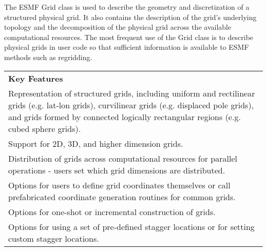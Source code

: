 %

The ESMF Grid class is used to describe the geometry and discretization
of a structured physical grid.  It also contains the description of the
grid's underlying topology and the decomposition of the physical grid
across the available computational resources.  The most frequent 
use of the Grid class is to describe physical grids in user
code so that sufficient information is available to ESMF methods
such as regridding. 

\begin{center}
\begin{tabular}{|p{6in}|}
\hline
\vspace{.01in}
{\bf Key Features} \\[.01in]
Representation of structured grids, including uniform and
rectilinear grids (e.g. lat-lon grids), curvilinear grids (e.g. displaced pole grids), 
and grids formed by connected logically rectangular regions (e.g. cubed
sphere grids).\\
Support for 2D, 3D, and higher dimension grids.\\ 
Distribution of grids across computational resources for parallel
operations -  users set which grid dimensions are distributed.\\
Options for users to define grid coordinates themselves or call prefabricated
coordinate generation routines for common grids.\\
Options for one-shot or incremental construction of grids.\\
Options for using a set of pre-defined stagger locations or for setting
custom stagger locations.\\[.03in] \hline
\end{tabular}
\end{center}

\medskip

